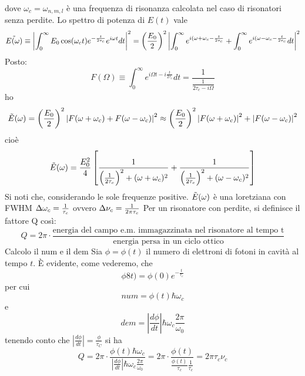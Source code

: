 dove $\omega_c = \omega_{n,m,l}$ è una frequenza di risonanza calcolata nel caso di risonatori senza perdite. Lo spettro di potenza di $E(t)$ vale
\begin{equation*}
\tilde{E(\omega)} \equiv \left| \int_0^\infty E_0 \cos(\omega_c t) e^{-\frac{t}{2\tau_c}} e^{i\omega t}
dt \right|^2 = \left( \frac{E_0}{2}\right)^2 \left| \int_0^\infty e^{i(\omega+\omega_c-\frac{t}{2\tau_c}} + \int_0^\infty e^{i(\omega-\omega_c-\frac{t}{2\tau_c}} dt \right|^2
\end{equation*}
Posto:
\begin{equation*}
F(\Omega) \equiv \int_0^\infty e^{i\Omega t - i\frac{t}{2\tau_c}} dt = \frac{1}{\frac{1}{2\tau_c - i\Omega}}
\end{equation*}
ho
\begin{equation*}
\tilde{E}(\omega) = \left(\frac{E_0}{2}\right)^2 \left| F(\omega + \omega_c) + F(\omega - \omega_c)\right|^2 \approx \left(\frac{E_0}{2}\right)^2 \left|F(\omega + \omega_c)\right|^2 + \left|F(\omega - \omega_c)\right|^2
\end{equation*}cioè
\begin{equation*}
\tilde{E}(\omega) = \frac{E_0^2}{4} \left[ \frac{1}{\left(\frac{1}{2\tau_c}\right)^2 + (\omega+\omega_c)^2} + \frac{1}{\left(\frac{1}{2\tau_c}\right)^2 + (\omega-\omega_c)^2}\right]
\end{equation*}
Si noti che, considerando le sole frequenze positive. $\tilde{E}(\omega)$ è una loretziana con FWHM $ \Delta \omega_c = \frac{1}{\tau_c}$ ovvero $\Delta \nu_c = \frac{1}{2\pi\tau_c}$
Per un risonatore con perdite, si definisce il fattore Q così:
\begin{equation*}
Q = 2\pi \cdot \frac{\text{energia del campo e.m. immagazzinata nel risonatore al tempo t}}{\text{energia persa in un ciclo ottico}}
\end{equation*}
Calcolo il num e il dem
Sia $\phi = \phi(t)$ il numero di elettroni di fotoni in cavità al tempo $t$. È evidente, come vederemo, che
\begin{equation*}
\phi8t) = \phi(0)e^{-\frac{t}{\tau_c}}
\end{equation*}
per cui
\begin{equation*}
num = \phi(t) \hbar \omega_c
\end{equation*}
e
\begin{equation*}
dem = \left| \frac{d\phi}{dt}\right| \hbar \omega_c \frac{2\pi}{\omega_0}
\end{equation*}
tenendo conto che $\left|\frac{d\phi}{dt}\right| = \frac{\phi}{\tau_C}$
si ha
\begin{equation*}
Q = 2\pi \cdot \frac{\phi(t) \hbar \omega_c}{\left|\frac{d\phi}{dt}\right| \hbar \omega_c \frac{2\pi}{\omega_0}} = 2\pi \cdot \frac{\phi(t)}{\frac{\phi(t)}{\tau_c} \frac{1}{\tau_c}} = 2\pi \tau_c \nu_c
\end{equation*}
